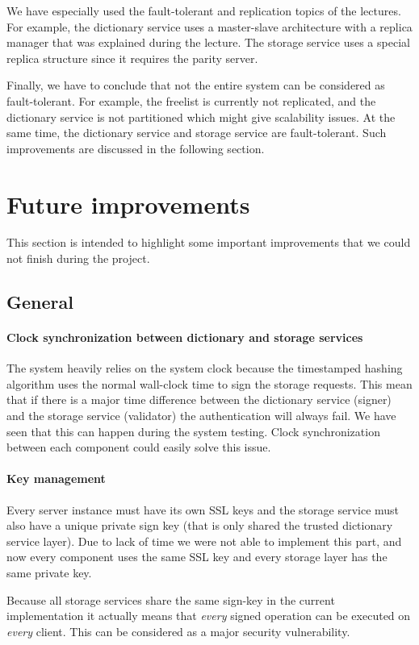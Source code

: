 \documentclass[12pt,a4paper]{scrartcl}
\begin{document}
We have especially used the fault-tolerant and replication topics of the lectures. For example, the dictionary service uses a master-slave architecture with a replica manager that was explained during the lecture. The storage service uses a special replica structure since it requires the parity server.

Finally, we have to conclude that not the entire system can be considered as fault-tolerant. For example, the freelist is currently not replicated, and the dictionary service is not partitioned which might give scalability issues. At the same time, the dictionary service and storage service are fault-tolerant. Such improvements are discussed in the following section.

\section{Future improvements}
This section is intended to highlight some important improvements that we could not finish during the project.

\subsection{General}
\paragraph{Clock synchronization between dictionary and storage services}
The system heavily relies on the system clock because the timestamped hashing algorithm uses the normal wall-clock time to sign the storage requests. This mean that if there is a major time difference between the dictionary service (signer) and the storage service (validator) the authentication will always fail. We have seen that this can happen during the system testing. Clock synchronization between each component could easily solve this issue.

\paragraph{Key management}
Every server instance must have its own SSL keys and the storage service must also have a unique private sign key (that is only shared the trusted dictionary service layer). Due to lack of time we were not able to implement this part, and now every component uses the same SSL key and every storage layer has the same private key.

Because all storage services share the same sign-key in the current implementation it actually means that \emph{every} signed operation can be executed on \emph{every} client. This can be considered as a major security vulnerability.
\end{document}
